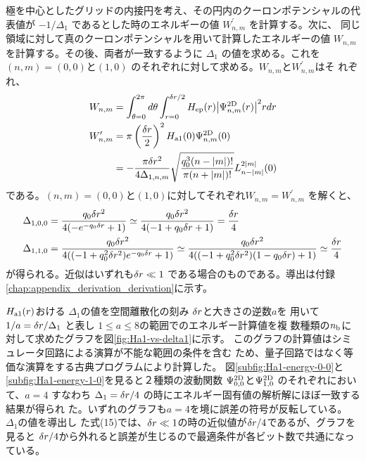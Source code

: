 \documentclass[fontsize=11pt]{jlreq}
\begin{document}
極を中心としたグリッドの内接円を考え、その円内のクーロンポテンシャルの代表値が
$-1/\Delta_1$ であるとした時のエネルギーの値 $W_{n,m}^\prime$ を計算する。次に、
同じ領域に対して真のクーロンポテンシャルを用いて計算したエネルギーの値 $W_{n,m}$
を計算する。その後、両者が一致するように $\Delta_1$ の値を求める。これを
$(n,m)=(0,0)$と$(1,0)$ のそれぞれに対して求める。$W_{n,m}$と$W_{n,m}^\prime$はそ
れぞれ、
\begin{align}
    W_{n,m}&=\int_{\theta=0}^{2\pi}d\theta\int_{r=0}^{\delta r/2}
    H_{\mathrm{ep}}(r){\left| \Psi^{\mathrm{2D}}_{n,m}(r) \right|}^2r dr\\
    W_{n,m}^\prime&=\pi\left(\frac{\delta r}{2}\right)^2
    H_{\mathrm{a1}}(0)\Psi^{\mathrm{2D}}_{n,m}(0) \notag \\
    &=-\frac{\pi\delta r^2}{4\Delta_{1,n,m}}
    \sqrt{\frac{q_0^3(n-{\left| m \right|})!}{\pi(n+{\left| m \right|})!}}
    L_{n-{\left| m \right|}}^{2{\left| m \right|}}(0)
\end{align}
である。$(n,m)=(0,0)$と$(1,0)$に対してそれぞれ$W_{n,m}=W_{n,m}^\prime$ を解くと、
\begin{align}
    \Delta_{1,0,0} &=\frac{q_0\delta r^2}{4(-e^{-q_0\delta r}+1)}
    \simeq \frac{q_0\delta r^2}{4(-1+q_0\delta r+1)}=\frac{\delta r}{4}
    \label{eq:delta-1-0-0}\\
    \Delta_{1,1,0} &=\frac{q_0\delta r^2}{4((-1+q_0^2\delta r^2)e^{-q_0\delta r}+1)}
    \simeq \frac{q_0\delta r^2}{4((-1+q_0^2\delta r^2)(1-q_0\delta r)+1)}
    \simeq\frac{\delta r}{4}
    \label{eq:delta-1-1-0}
\end{align}
が得られる。近似はいずれも$\delta r\ll1$ である場合のものである。導出は付録
\ref{chap:appendix_derivation_derivation}に示す。

$H_{\mathrm{a1}} (r)$おける $\Delta_1$の値を空間離散化の刻み $\delta r$と大きさの逆数$a$を
用いて $1/a=\delta r/\Delta_1$ と表し $1\le a\le 8$の範囲でのエネルギー計算値を複
数種類の$n_{\mathrm{b}}$に対して求めたグラフを図\ref{fig:Ha1-vs-delta1}に示す。
このグラフの計算値はシミュレータ回路による演算が不能な範囲の条件を含む
ため、量子回路ではなく等価な演算をする古典プログラムにより計算した。
図\ref{subfig:Ha1-energy-0-0}と\ref{subfig:Ha1-energy-1-0}を見ると２種類の波動関数
$\Psi^{\mathrm{2D}}_{0,0}$と$\Psi^{\mathrm{2D}}_{1,0}$ のそれぞれにおいて、$a=4$ すなわち
$\Delta_1=\delta r/4$ の時にエネルギー固有値の解析解にほぼ一致する結果が得られ
た。いずれのグラフも$a=4$を境に誤差の符号が反転している。 $\Delta_1$の値を導出し
た式(15)では、$\delta r\ll1$の時の近似値が$\delta r/4$であるが、グラフを見ると
$\delta r/4$から外れると誤差が生じるので最適条件が各ビット数で共通になっている。
\end{document}
